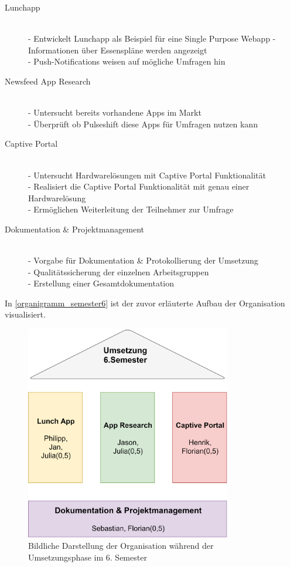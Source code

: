 \begin{description}
\item[Lunchapp]\hfill \\
- Entwickelt Lunchapp als Beispiel für eine Single Purpose Webapp
- Informationen über Essenspläne werden angezeigt\\
- Push-Notifications weisen auf mögliche Umfragen hin


\item[Newsfeed App Research]\hfill \\
- Untersucht bereits vorhandene Apps im Markt\\
- Überprüft ob Pulseshift diese Apps für Umfragen nutzen kann

\item[Captive Portal]\hfill \\
- Untersucht Hardwarelösungen mit Captive Portal Funktionalität\\
- Realisiert die Captive Portal Funktionalität mit genau einer Hardwarelösung\\
- Ermöglichen Weiterleitung der Teilnehmer zur Umfrage

\item[Dokumentation \& Projektmanagement]\hfill \\
- Vorgabe für Dokumentation \& Protokollierung der Umsetzung\\
- Qualitätssicherung der einzelnen Arbeitsgruppen\\
- Erstellung einer Gesamtdokumentation
\end{description}

In \vref{organigramm_semester6} ist der zuvor erläuterte Aufbau der Organisation visualisiert.

\begin{figure}[h]
\centering
\includegraphics[width=9cm]{images/organigramm_semester6}
\caption{Bildliche Darstellung der Organisation während der Umsetzungsphase im 6. Semester\protect}
\label{organigramm_semester6}
\end{figure}